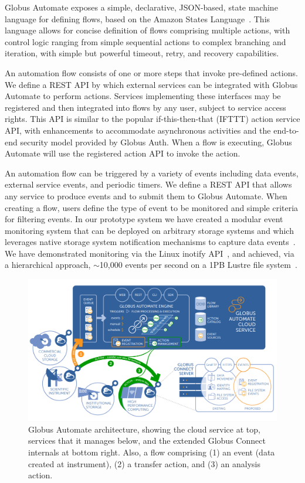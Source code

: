 \documentclass{aip-cp}
\begin{document}
Globus Automate exposes a simple, declarative, JSON-based, state machine 
language for defining flows, 
based on the Amazon States Language~\cite{AmazonStates}. 
This language allows for concise definition of flows comprising multiple actions, with control logic 
ranging from simple sequential actions to complex branching and iteration, with simple but powerful 
timeout, retry, and recovery capabilities. 

An automation flow consists of one or more steps that invoke pre-defined actions. 
We define a REST API by which external services can be integrated with Globus Automate to perform 
actions. 
Services implementing these interfaces may
be registered and then integrated into flows by any user, subject to service access rights. 
This API is similar to the popular if-this-then-that (IFTTT) action service API, 
with enhancements to accommodate asynchronous activities and the end-to-end security model provided 
by Globus Auth. When a flow is executing, Globus Automate will use
the registered action API to invoke the action.

An automation flow can be triggered by a variety of events including 
data events, external service events, and periodic timers.
We define a REST API that allows any service to produce events
and to submit them to Globus Automate. When creating a flow, 
users define the type of event to be monitored and simple criteria
for filtering events. 
In our prototype system we have created a modular event monitoring system that
can be deployed on arbitrary storage systems and which leverages
native storage system notification mechanisms to capture data events~\cite{chard17ripple}. 
We have demonstrated monitoring via the Linux
inotify API~\cite{inotify}, and achieved, via a hierarchical approach, 
$\sim$10,000 events per second on a 1PB Lustre file system~\cite{paul17scalable}.  

\begin{figure}[h]
  \centerline{\includegraphics[width=6in]{Figs/automate.png}}
  \caption{Globus Automate architecture, showing the cloud service at top, services that it
    manages below, and the extended Globus Connect internals at bottom right. Also, a flow
    comprising 
    (1) an event (data created at instrument), (2) a transfer action, and (3) an analysis action.
\label{fig:automate}}
\end{figure}
\end{document}
